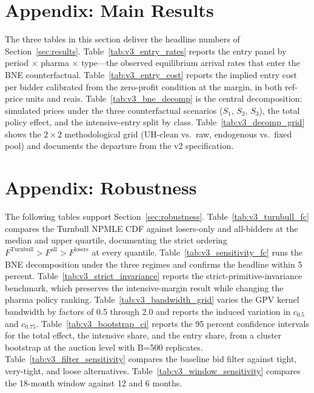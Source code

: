 \section{Appendix: Main Results}\label{app:main}

The three tables in this section deliver the headline numbers of Section~\ref{sec:results}. Table~\ref{tab:v3_entry_rates} reports the entry panel by period $\times$ pharma $\times$ type---the observed equilibrium arrival rates that enter the BNE counterfactual. Table~\ref{tab:v3_entry_cost} reports the implied entry cost per bidder calibrated from the zero-profit condition at the margin, in both ref-price units and reais. Table~\ref{tab:v3_bne_decomp} is the central decomposition: simulated prices under the three counterfactual scenarios ($S_1$, $S_2$, $S_3$), the total policy effect, and the intensive-entry split by class. Table~\ref{tab:v3_decomp_grid} shows the $2 \times 2$ methodological grid (UH-clean vs.\ raw, endogenous vs.\ fixed pool) and documents the departure from the v2 specification.






\section{Appendix: Robustness}\label{app:robust}

The following tables support Section~\ref{sec:robustness}. Table~\ref{tab:v3_turnbull_fc} compares the Turnbull NPMLE CDF against losers-only and all-bidders at the median and upper quartile, documenting the strict ordering $F^{\text{Turnbull}} > F^{\text{all}} > F^{\text{losers}}$ at every quantile. Table~\ref{tab:v3_sensitivity_fc} runs the BNE decomposition under the three regimes and confirms the headline within 5 percent. Table~\ref{tab:v3_strict_invariance} reports the strict-primitive-invariance benchmark, which preserves the intensive-margin result while changing the pharma policy ranking. Table~\ref{tab:v3_bandwidth_grid} varies the GPV kernel bandwidth by factors of 0.5 through 2.0 and reports the induced variation in $c_{0.5}$ and $c_{0.75}$. Table~\ref{tab:v3_bootstrap_ci} reports the 95 percent confidence intervals for the total effect, the intensive share, and the entry share, from a cluster bootstrap at the auction level with B=500 replicates. Table~\ref{tab:v3_filter_sensitivity} compares the baseline bid filter against tight, very-tight, and loose alternatives. Table~\ref{tab:v3_window_sensitivity} compares the 18-month window against 12 and 6 months.

